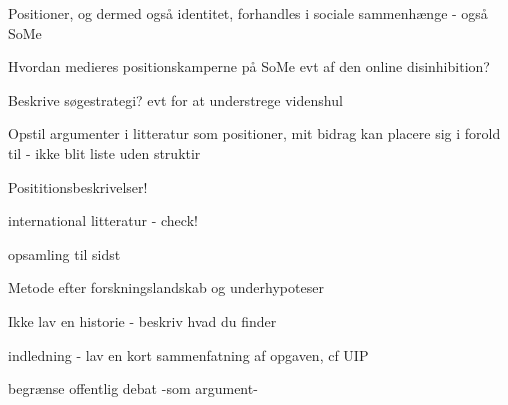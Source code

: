 Positioner, og dermed også identitet, forhandles i sociale
sammenhænge - også SoMe 

Hvordan medieres positionskamperne på SoMe evt af den online
disinhibition?

Beskrive søgestrategi? evt for at understrege videnshul

Opstil argumenter i litteratur som positioner, mit bidrag kan
placere sig i forold til - ikke blit liste uden struktir

Posititionsbeskrivelser!

international litteratur - check! 

opsamling til sidst

Metode efter forskningslandskab og underhypoteser

Ikke lav en historie - beskriv hvad du finder

indledning - lav en kort sammenfatning af opgaven, cf UIP

begrænse offentlig debat -som argument-
